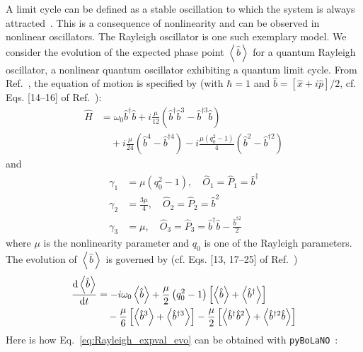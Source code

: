 \documentclass[onecolumn, 12pt, sort&compress]{elsarticle}
\newcommand{\expval}[1]{\left\langle{#1}\right\rangle}
\newcommand{\bop}{\hat{b}}
\newcommand{\bdag}{\bop^\dagger}
\newcommand{\bdagn}[1]{\bop^{\dagger {#1}}}
\newcommand{\pybolano}{\texttt{pyBoLaNO}~}
\begin{document}
A limit cycle can be defined as a stable oscillation to which the system is always attracted~\cite{pikovsky_synchronization_2001}. This is a consequence of nonlinearity and can be observed in nonlinear oscillators. The Rayleigh oscillator is one such exemplary model. We consider the evolution of the expected phase point $\expval{\bop}$ for a quantum Rayleigh oscillator, a nonlinear quantum oscillator exhibiting a quantum limit cycle. From Ref.~\cite{chia_relaxation_2020}, the equation of motion is specified by (with $\hbar=1$ and $\bop=\left[\hat{x}+i\hat{p}\right]/2$, cf. Eqs. [14--16] of Ref.~\cite{chia_relaxation_2020}):
\begin{equation}
\begin{split}
    \hat{H} &= \omega_0\bdag\bop + i\frac{\mu}{12}\left(\bdag\bop^3-\bdagn{3}\bop\right) 
    \\
    &\quad + i\frac{\mu}{24}\left(\bop^4-\bdagn{4}\right) - i\frac{\mu\left(q_0^2-1\right)}{4}\left(\bop^2-\bdagn{2}\right)
\end{split}
\end{equation}
and
\begin{subequations}
\begin{align}
    \gamma_1 &= \mu\left(q_0^2-1\right),\quad \hat{O}_1=\hat{P}_1 = \bdag 
    \\
    \gamma_2 &= \frac{3\mu}{4}, \quad \hat{O}_2 = \hat{P}_2=\bop^2
    \\
    \gamma_3 &= \mu, \quad \hat{O}_3=\hat{P}_3 = \bdag\bop - \frac{\bdagn{2}}{2}
\end{align}
\end{subequations}
where $\mu$ is the nonlinearity parameter and $q_0$ is one of the Rayleigh parameters. The evolution of $\expval{\bop}$ is governed by (cf. Eqs. [13, 17--25] of Ref.~\cite{chia_relaxation_2020})
\begin{equation}\label{eq:Rayleigh_expval_evo}
\begin{split}
    \odv{\expval{\bop}}{t} &= -i\omega_0\expval{\bop} + \frac{\mu}{2} \left(q_0^2-1\right) \left[\expval{\bop}+\expval{\bdag}\right] 
    \\
    &\quad -\frac{\mu}{6}\left[\expval{\bop^3}+\expval{\bdagn{3}}\right] - \frac{\mu}{2}\left[\expval{\bdag\bop^2}+\expval{\bdagn{2}\bop}\right]
\end{split}
\end{equation}
Here is how Eq.~\eqref{eq:Rayleigh_expval_evo} can be obtained with \pybolano:
\end{document}
